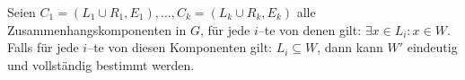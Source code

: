 \begin{korollar}
Seien $C_1 = (L_1 \cup R_1, E_1), ..., C_k = (L_k \cup R_k, E_k)$ alle Zusammenhangskomponenten in $G$,
für jede $i$--te von denen gilt: $\exists x \in L_i : x \in W$.
Falls für jede $i$--te von diesen Komponenten gilt: $L_i \subseteq W$, dann
kann $W'$ eindeutig und vollständig bestimmt werden.
\end{korollar}
